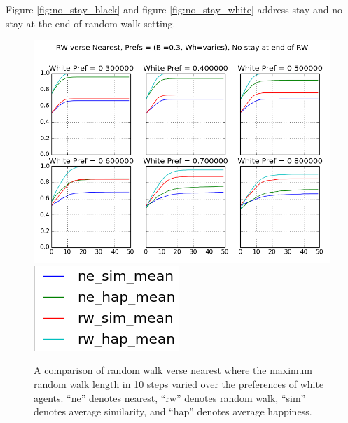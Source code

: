 \documentclass[11pt,twoside]{amsart}
\theoremstyle{theorem}
\theoremstyle{definition}
\theoremstyle{remark}
\begin{document}
Figure \ref{fig:no_stay_black} and figure \ref{fig:no_stay_white} address stay and no stay at the end of random walk setting.
    \begin{figure}[p]
        \center
        \includegraphics[scale=0.60]{compare_nearest_rw.png}
        \includegraphics[scale=0.50]{compare_nearest_rw_legend.png}
        \caption{A comparison of random walk verse nearest where the maximum random walk length in 10 steps varied over the preferences of white agents. ``ne'' denotes nearest, ``rw'' denotes random walk, ``sim'' denotes average similarity, and ``hap'' denotes average happiness.}
        \label{fig:nearest_vs_rw}
    \end{figure}
\end{document}
